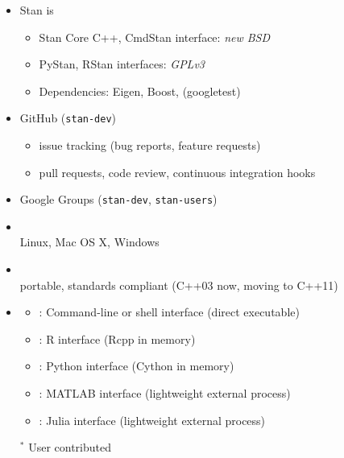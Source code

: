 \documentclass[10pt]{report}
\newcommand{\sld}[1]{\newpage{\noindent\LARGE \ \ \
    \textcolor{MidnightBlue}{\bfseries #1}}\vspace*{4pt}}
\newcommand{\myemph}[1]{{\color{MidnightBlue}{\bfseries #1}}}
\begin{document}
\sld{Stan is Open}

\begin{itemize}
\item Stan is \myemph{open source}
\vspace*{-4pt}
\begin{itemize} 
\small
\item Stan Core C++, CmdStan interface: {\slshape new BSD}
\item PyStan, RStan interfaces: {\slshape GPLv3}
\item Dependencies: Eigen, Boost, (googletest)
\end{itemize}
\item GitHub \myemph{hosted publicly} {\small ({\tt stan-dev})}
\vspace*{-4pt}
\begin{itemize}
\small
\item issue tracking (bug reports, feature requests)
\item pull requests, code review, continuous integration hooks
\end{itemize}
\item Google Groups \myemph{public mailing lists} {\small ({\tt stan-dev}, {\tt stan-users})}
\end{itemize}

\sld{Platforms and Interfaces}

\begin{itemize}
\item \myemph{Platforms}
\\
Linux, Mac OS X, Windows
\item \myemph{C++ API}
\\
{\footnotesize portable, standards compliant (C++03 now, moving to C++11)}
\item \myemph{Interfaces}
\vspace*{-4pt}
\begin{itemize}\footnotesize
\item \myemph{CmdStan}: Command-line or shell interface (direct executable)
\item \myemph{RStan}: R interface (Rcpp in memory)
\item \myemph{PyStan}: Python interface (Cython in memory)
\item \myemph{MStan$^*$}: MATLAB interface (lightweight external process)
\item \myemph{JuliaStan$^*$}: Julia interface (lightweight external process)
\end{itemize}
{\footnotesize ${}^*$ User contributed}
\end{itemize}
\vfill
\end{document}
